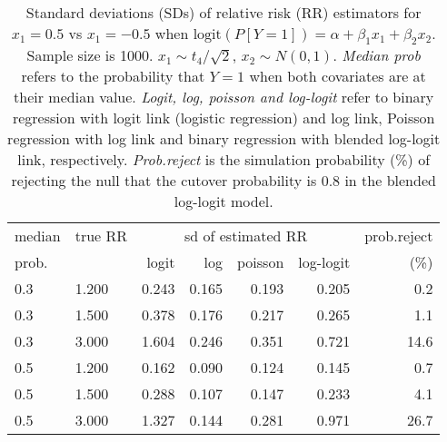 \documentclass[12pt,a4paper]{article}
\begin{document}
\begin{table}[H] 
\small\sf\centering 
\caption{Standard deviations (SDs) of relative risk (RR) estimators for $x_1=0.5$ vs $x_1=-0.5$ when $\mbox{logit}(P[Y=1])=\alpha+\beta_1 x_1 + \beta_2 x_2$. Sample size is 1000. $x_1 \sim $$t_4/\sqrt{2}$, $x_2 \sim N(0,1)$. {\it Median prob} refers to the probability that $Y=1$ when both covariates are at their median value. {\it Logit, log, poisson and log-logit} refer to binary regression with logit link (logistic regression) and log link, Poisson regression with log link and binary regression with blended log-logit link, respectively. {\it Prob.reject} is the simulation probability (\%) of rejecting the null that the cutover probability is $0.8$ in the blended log-logit model.} 
\begin{tabular}{llrrrrr} 
\toprule 
median & true RR & \multicolumn{4}{c}{sd of estimated RR} & prob.reject \\ 
prob. & & logit & log & poisson & log-logit  & (\%) \\ \midrule 
0.3 & 1.200 & 0.243 & 0.165 & 0.193 & 0.205 &  0.2 \\  
0.3 & 1.500 & 0.378 & 0.176 & 0.217 & 0.265 &  1.1 \\  
0.3 & 3.000 & 1.604 & 0.246 & 0.351 & 0.721 & 14.6 \\  
0.5 & 1.200 & 0.162 & 0.090 & 0.124 & 0.145 &  0.7 \\  
0.5 & 1.500 & 0.288 & 0.107 & 0.147 & 0.233 &  4.1 \\  
0.5 & 3.000 & 1.327 & 0.144 & 0.281 & 0.971 & 26.7 \\  
\bottomrule 
\end{tabular} 
\end{table} 
\end{document}
